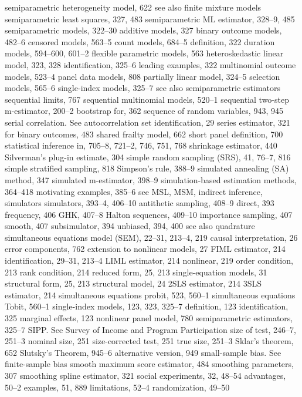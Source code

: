 semiparametric heterogeneity model, 622 see also finite mixture models
semiparametric least squares, 327, 483
semiparametric ML estimator, 328–9, 485 semiparametric models, 322–30
additive models, 327
binary outcome models, 482–6 censored models, 563–5
count models, 684–5
definition, 322
duration models, 594–600, 601–2 flexible parametric models, 563 heteroskedastic linear model, 323, 328 identification, 325–6
leading examples, 322
multinomial outcome models, 523–4 panel data models, 808
partially linear model, 324–5
selection models, 565–6
single-index models, 325–7
see also semiparametric estimators
sequential limits, 767
sequential multinomial models, 520–1 sequential two-step m-estimator, 200–2
bootstrap for, 362
sequence of random variables, 943, 945 serial correlation. See autocorrelation set identification, 29
series estimator, 321
for binary outcomes, 483 shared frailty model, 662 short panel
definition, 700
statistical inference in, 705–8, 721–2, 746, 751, 768 shrinkage estimator, 440
Silverman’s plug-in estimate, 304
simple random sampling (SRS), 41, 76–7, 816
simple stratified sampling, 818
Simpson’s rule, 388–9
simulated annealing (SA) method, 347 simulated m-estimator, 398–9 simulation-based estimation methods, 364–418
motivating examples, 385–6
see MSL, MSM, indirect inference, simulators simulators, 393–4, 406–10
antithetic sampling, 408–9 direct, 393
frequency, 406
GHK, 407–8
Halton sequences, 409–10 importance sampling, 407 smooth, 407 subsimulator, 394 unbiased, 394, 400
see also quadrature
simultaneous equations model (SEM), 22–31, 213–4,
219
causal interpretation, 26
error components, 762
extension to nonlinear models, 27 FIML estimator, 214
identification, 29–31, 213–4 LIML estimator, 214 nonlinear, 219
order condition, 213
rank condition, 214 reduced form, 25, 213 single-equation models, 31 structural form, 25, 213 structural model, 24
2SLS estimator, 214
3SLS estimator, 214
simultaneous equations probit, 523, 560–1 simultaneous equations Tobit, 560–1 single-index models, 123, 323, 325–7
definition, 123
identification, 325
marginal effects, 123
nonlinear panel model, 780 semiparametric estimators, 325–7
SIPP. See Survey of Income and Program Participation size of test, 246–7, 251–3
nominal size, 251 size-corrected test, 251 true size, 251–3
Sklar’s theorem, 652 Slutsky’s Theorem, 945–6 alternative version, 949
small-sample bias. See finite-sample bias smooth maximum score estimator, 484 smoothing parameters, 307
smoothing spline estimator, 321
social experiments, 32, 48–54 advantages, 50–2 examples, 51, 889 limitations, 52–4 randomization, 49–50
